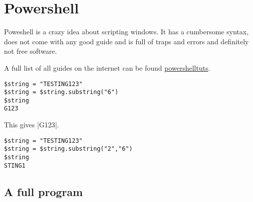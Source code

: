 \chapter{Powershell}
 
 
Poweshell is a crazy idea about scripting windows. It has a cumbersome syntax, does not come with any good guide
and is full of traps and errors and definitely not free software.

A full list of all guides on the internet can be found \href{http://stackoverflow.com/questions/9956109/looking-for-quick-and-complete-powershell-tutorial}{powershelltuts}.

\begin{verbatim}
$string = "TESTING123"
$string = $string.substring("6")
$string
G123
\end{verbatim}

This gives |G123|.

\begin{verbatim}
$string = "TESTING123"
$string = $string.substring("2","6")
$string
STING1
\end{verbatim}

\section{A full program}
\makeatletter
\expandafter\gdef\csname PY@tok@err\endcsname{}

